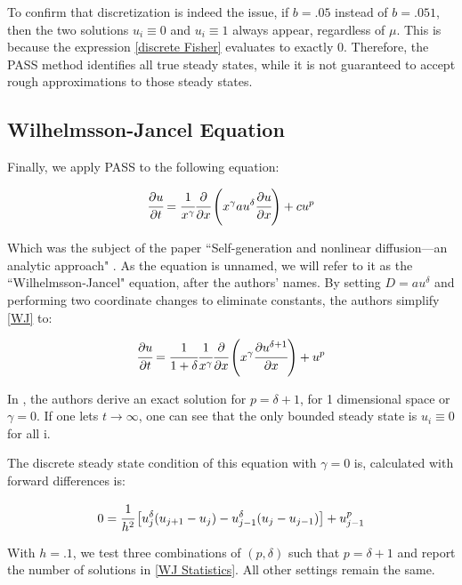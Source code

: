\documentclass[11pt]{article}
\begin{document}
To confirm that discretization is indeed the issue, if $b = .05$ instead of $b = .051$, then the two solutions $u_i \equiv 0$ and $u_i \equiv 1$ always appear, regardless of $\mu$. This is because the expression \eqref{discrete Fisher} evaluates to exactly 0. Therefore, the PASS method identifies all true steady states, while it is not guaranteed to accept rough approximations to those steady states.

\subsection{Wilhelmsson-Jancel Equation}

Finally, we apply PASS to the following equation:

\begin{equation}
    \label{WJ}
    \cfrac{\partial{u}}{\partial{t}} = \cfrac{1}{x^\gamma} \cfrac{\partial}{\partial{x}} \left( x^\gamma au^\delta \cfrac{\partial{u}}{\partial{x}} \right) + cu^p
\end{equation}

Which was the subject of the paper ``Self-generation and nonlinear diffusion---an analytic approach" \citep{WJ}. As the equation is unnamed, we will refer to it as the ``Wilhelmsson-Jancel" equation, after the authors' names. By setting $D = au^\delta$ and performing two coordinate changes to eliminate constants, the authors simplify \cref{WJ} to:

\begin{equation}
  \label{Simplified WJ}
  \cfrac{\partial{u}}{\partial{t}} = \cfrac{1}{1+\delta} \cfrac{1}{x^\gamma} \cfrac{\partial}{\partial{x}}\left(x^\gamma \cfrac{\partial{u^{\delta + 1}}}{\partial{x}} \right) + u^p
\end{equation}

In \citep{WJ}, the authors derive an exact solution for $p = \delta + 1$, for 1 dimensional space or $\gamma = 0$. If one lets $t \rightarrow \infty$, one can see that the only bounded steady state is $u_i \equiv 0$ for all i.

The discrete steady state condition of this equation with $\gamma = 0$ is, calculated with forward differences is:

\begin{equation}
  \label{discrete WJ}
  0 = \cfrac{1}{h^2} \left[ u_{j}^\delta (u_{j+1} - u_{j}) - u_{j-1}^\delta (u_{j} - u_{j-1}) \right] + u_{j-1}^p
\end{equation}

With $h = .1$, we test three combinations of $(p, \delta)$ such that $p = \delta + 1$ and report the number of solutions in \cref{WJ Statistics}. All other settings remain the same.
\end{document}
